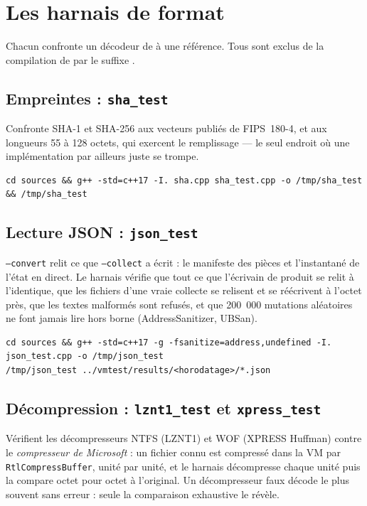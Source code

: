 \documentclass[11pt,a4paper,oneside]{report}
\begin{document}
\chapter{Les harnais de format}\label{ch:format}

Chacun confronte un décodeur de \wac{} à une référence. Tous sont exclus de la
compilation de \wac{} par le suffixe .

\section{Empreintes : \texttt{sha\_test}}

Confronte SHA-1 et SHA-256 aux vecteurs publiés de FIPS~180-4, et aux longueurs
55 à 128 octets, qui exercent le remplissage — le seul endroit où une
implémentation par ailleurs juste se trompe.

\begin{lstlisting}
cd sources && g++ -std=c++17 -I. sha.cpp sha_test.cpp -o /tmp/sha_test && /tmp/sha_test
\end{lstlisting}

\section{Lecture JSON : \texttt{json\_test}}

\texttt{--convert} relit ce que \texttt{--collect} a écrit : le manifeste des
pièces et l'instantané de l'état en direct. Le harnais vérifie que tout ce que
l'écrivain de \wac{} produit se relit à l'identique, que les fichiers d'une
vraie collecte se relisent et se réécrivent à l'octet près, que les textes
malformés sont refusés, et que 200~000 mutations aléatoires ne font jamais lire
hors borne (AddressSanitizer, UBSan).

\begin{lstlisting}
cd sources && g++ -std=c++17 -g -fsanitize=address,undefined -I. json_test.cpp -o /tmp/json_test
/tmp/json_test ../vmtest/results/<horodatage>/*.json
\end{lstlisting}

\section{Décompression : \texttt{lznt1\_test} et \texttt{xpress\_test}}

Vérifient les décompresseurs NTFS (LZNT1) et WOF (XPRESS Huffman) contre le
\emph{compresseur de Microsoft} : un fichier connu est compressé dans la VM par
\texttt{RtlCompressBuffer}, unité par unité, et le harnais décompresse chaque
unité puis la compare octet pour octet à l'original. Un décompresseur faux
décode le plus souvent sans erreur : seule la comparaison exhaustive le révèle.
\end{document}
